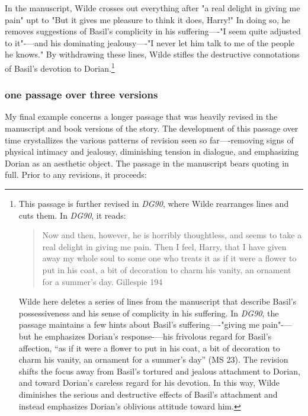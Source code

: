 \documentclass[11pt]{article}
\begin{document}
In the manuscript, Wilde crosses out everything after "a real delight
in giving me pain" upt to "But it gives me pleasure to think it does,
Harry!" In doing so, he removes suggestions of Basil’s complicity in
his suffering—-"I seem quite adjusted to it"-—and his dominating
jealousy—-"I never let him talk to me of the people he knows." By
withdrawing these lines, Wilde stifles the destructive connotations of
Basil’s devotion to Dorian.\footnote{This passage is further revised in \emph{DG90}, where Wilde
rearranges lines and cuts them. In \emph{DG90}, it reads:

\begin{quote}
Now and then, however, he is horribly thoughtless, and seems to take a
real delight in giving me pain. Then I feel, Harry, that I have given
away my whole soul to some one who treats it as if it were a flower to
put in his coat, a bit of decoration to charm his vanity, an ornament
for a summer’s day. Gillespie 194
\end{quote}

Wilde here deletes a series of lines from the manuscript that describe
Basil’s possessiveness and his sense of complicity in his
suffering. In \emph{DG90}, the passage maintains a few hints about Basil’s
suffering—-"giving me pain"-—but he emphasizes Dorian’s response-—his
frivolous regard for Basil’s affection, “as if it were a flower to put
in his coat, a bit of decoration to charm his vanity, an ornament for
a summer’s day” (MS 23). The revision shifts the focus away from
Basil’s tortured and jealous attachment to Dorian, and toward Dorian’s
careless regard for his devotion. In this way, Wilde diminishes the
serious and destructive effects of Basil’s attachment and instead
emphasizes Dorian’s oblivious attitude toward him.}

\subsubsection{one passage over three versions}
\label{sec:org787979b}
My final example concerns a longer passage that was heavily revised in
the manuscript and book versions of the story. The development of this
passage over time crystallizes the various patterns of revision seen
so far—-removing signs of physical intimacy and jealousy, diminishing
tension in dialogue, and emphasizing Dorian as an aesthetic
object. The passage in the manuscript bears quoting in full. Prior to
any revisions, it proceeds:
\end{document}
